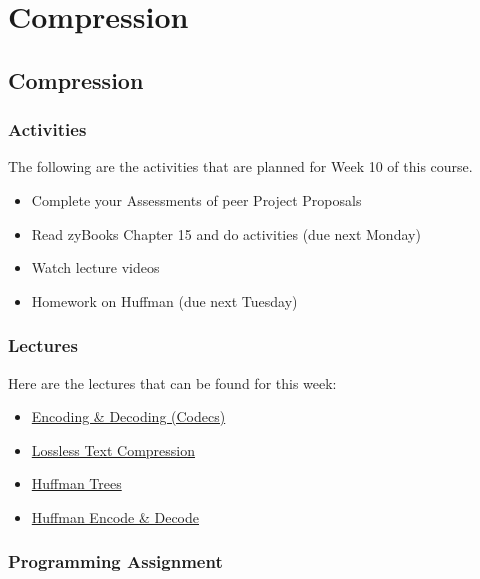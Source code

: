 \clearpage

\renewcommand{\ChapTitle}{Compression}

\chapter{\ChapTitle}
\section{\ChapTitle}

\subsection{Activities}

The following are the activities that are planned for Week 10 of this course.

\begin{itemize}
    \item Complete your Assessments of peer Project Proposals
    \item Read zyBooks Chapter 15 and do activities (due next Monday)
    \item Watch lecture videos
    \item Homework on Huffman (due next Tuesday)
\end{itemize}

\subsection{Lectures}

Here are the lectures that can be found for this week:

\begin{itemize}
    \item \href{https://applied.cs.colorado.edu/mod/hvp/view.php?id=46028}{Encoding \& Decoding (Codecs)}
    \item \href{https://applied.cs.colorado.edu/mod/hvp/view.php?id=46029}{Lossless Text Compression}
    \item \href{https://applied.cs.colorado.edu/mod/hvp/view.php?id=46030}{Huffman Trees}
    \item \href{https://applied.cs.colorado.edu/mod/hvp/view.php?id=46031}{Huffman Encode \& Decode}
\end{itemize}

\subsection{Programming Assignment}


